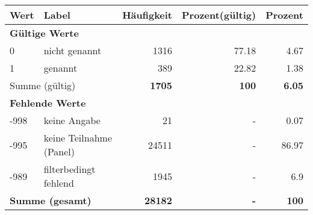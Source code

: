      \begin{longtable}{lXrrr}
     \toprule
     \textbf{Wert} & \textbf{Label} & \textbf{Häufigkeit} & \textbf{Prozent(gültig)} & \textbf{Prozent} \\
     \endhead
     \midrule
     \multicolumn{5}{l}{\textbf{Gültige Werte}}\\

     0 &
     \multicolumn{1}{X}{ nicht genannt   } &


       \num{1316} &
       \num[round-mode=places,round-precision=2]{77,18} &
         \num[round-mode=places,round-precision=2]{4,67} \\

     1 &
     \multicolumn{1}{X}{ genannt   } &


       \num{389} &
       \num[round-mode=places,round-precision=2]{22,82} &
         \num[round-mode=places,round-precision=2]{1,38} \\
     \midrule
     \multicolumn{2}{l}{Summe (gültig)} &
       \textbf{\num{1705}} &
     \textbf{100} &
       \textbf{\num[round-mode=places,round-precision=2]{6,05}} \\
     \multicolumn{5}{l}{\textbf{Fehlende Werte}}\\
       -998 &
       keine Angabe &
         \num{21} &
        - &
         \num[round-mode=places,round-precision=2]{0,07} \\
       -995 &
       keine Teilnahme (Panel) &
         \num{24511} &
        - &
         \num[round-mode=places,round-precision=2]{86,97} \\
       -989 &
       filterbedingt fehlend &
         \num{1945} &
        - &
         \num[round-mode=places,round-precision=2]{6,9} \\
     \midrule
     \multicolumn{2}{l}{\textbf{Summe (gesamt)}} &
          \textbf{\num{28182}} &
        \textbf{-} &
        \textbf{100} \\
     \bottomrule
     \end{longtable}
     
